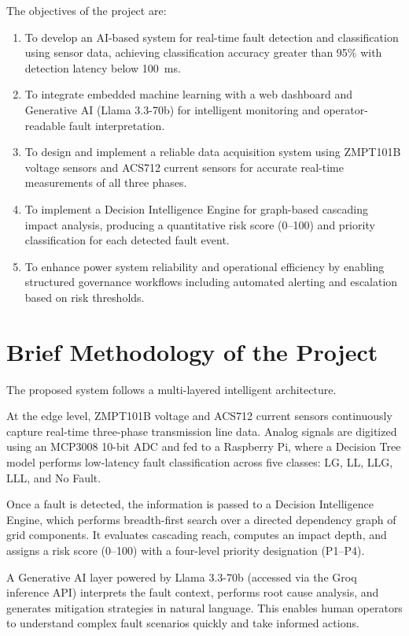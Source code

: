The objectives of the project are:
\begin{enumerate}
\setlength{\itemsep}{0pt}
\setlength{\parskip}{0pt}
\setlength{\parsep}{0pt}
\item To develop an AI-based system for real-time fault detection and classification using sensor data, achieving classification accuracy greater than 95\% with detection latency below 100~ms.
\item To integrate embedded machine learning with a web dashboard and Generative AI (Llama 3.3-70b) for intelligent monitoring and operator-readable fault interpretation.
\item To design and implement a reliable data acquisition system using ZMPT101B voltage sensors and ACS712 current sensors for accurate real-time measurements of all three phases.
\item To implement a Decision Intelligence Engine for graph-based cascading impact analysis, producing a quantitative risk score (0--100) and priority classification for each detected fault event.
\item To enhance power system reliability and operational efficiency by enabling structured governance workflows including automated alerting and escalation based on risk thresholds.
\end{enumerate}

\section{\textbf{Brief Methodology of the Project}}

The proposed system follows a multi-layered intelligent architecture.

At the edge level, ZMPT101B voltage and ACS712 current sensors continuously capture real-time three-phase transmission line data. Analog signals are digitized using an MCP3008 10-bit ADC and fed to a Raspberry Pi, where a Decision Tree model performs low-latency fault classification across five classes: LG, LL, LLG, LLL, and No Fault.

Once a fault is detected, the information is passed to a Decision Intelligence Engine, which performs breadth-first search over a directed dependency graph of grid components. It evaluates cascading reach, computes an impact depth, and assigns a risk score (0--100) with a four-level priority designation (P1–P4).

A Generative AI layer powered by Llama 3.3-70b (accessed via the Groq inference API) interprets the fault context, performs root cause analysis, and generates mitigation strategies in natural language. This enables human operators to understand complex fault scenarios quickly and take informed actions.

